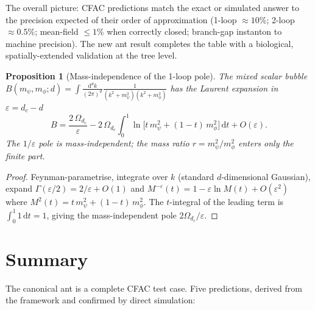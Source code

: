 \documentclass[10pt,a4paper,twocolumn]{article}
\newcommand{\dd}{\mathrm{d}}
\newtheorem{proposition}[theorem]{Proposition}
\theoremstyle{definition}
\begin{document}
The overall picture: CFAC predictions match the exact or
simulated answer to the precision expected of their order of
approximation (1-loop $\approx 10\%$; 2-loop $\approx 0.5\%$;
mean-field $\leq 1\%$ when correctly closed; branch-gap
instanton to machine precision).  The new ant result completes
the table with a biological, spatially-extended validation at
the tree level.


\begin{proposition}[Mass-independence of the 1-loop pole]
\label{prop:mass-indep-thm}
The mixed scalar bubble
$B(m_\psi, m_\phi; d) = \int \frac{\dd^d k}{(2\pi)^d}
\frac{1}{(k^2 + m_\psi^2)(k^2 + m_\phi^2)}$
has the Laurent expansion in $\varepsilon = d_c - d$
\begin{equation}
  B = \frac{2\,\Omega_{d_c}}{\varepsilon}
  - 2\,\Omega_{d_c}\int_0^1\!\ln\bigl[
    t\,m_\psi^2 + (1{-}t)\,m_\phi^2\bigr]\,\dd t
  + O(\varepsilon).
\end{equation}
The $1/\varepsilon$ pole is mass-independent; the mass ratio
$r = m_\psi^2/m_\phi^2$ enters only the finite part.
\end{proposition}

\begin{proof}
Feynman-parametrise, integrate over $k$ (standard
$d$-dimensional Gaussian), expand
$\Gamma(\varepsilon/2) = 2/\varepsilon + O(1)$ and
$M^{-\varepsilon}(t) = 1 - \varepsilon \ln M(t) + O(\varepsilon^2)$
where $M^2(t) = t\,m_\psi^2 + (1{-}t)\,m_\phi^2$.  The
$t$-integral of the leading term is $\int_0^1 1\,\dd t = 1$,
giving the mass-independent pole $2\Omega_{d_c}/\varepsilon$.
\end{proof}

\fi

\section{Summary}\label{sec:summary}

The canonical ant is a complete CFAC test case.  Five
predictions, derived from the framework and confirmed by direct
simulation:
\end{document}
